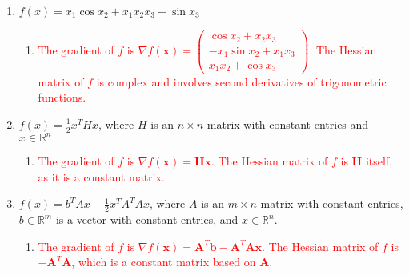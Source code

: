 \documentclass[11pt]{article}
\begin{document}
\begin{enumerate}
\begin{enumerate}
  \item $f(x) = x_1 \cos x_2 + x_1x_2x_3 + \sin x_3$

    \begin{enumerate}
        \item[\textcolor{red}{}] \textcolor{red}{
        The gradient of $f$ is $\nabla f(\mathbf{x}) = \begin{pmatrix} \cos x_2 + x_2x_3 \\ -x_1 \sin x_2 + x_1x_3 \\ x_1x_2 + \cos x_3 \end{pmatrix}$. The Hessian matrix of $f$ is complex and involves second derivatives of trigonometric functions.
        }
    \end{enumerate}
  
  \item $f(x) = \frac{1}{2} x^T\!Hx$, where $H$ is an $n \times n$
    matrix with constant entries and $x \in \mathbb{R}^n$

    \begin{enumerate}
        \item[\textcolor{red}{}] \textcolor{red}{
        The gradient of $f$ is $\nabla f(\mathbf{x}) = \mathbf{H} \mathbf{x}$. The Hessian matrix of $f$ is $\mathbf{H}$ itself, as it is a constant matrix.
        }
    \end{enumerate}
    
  \item $f(x) = b^T\!Ax - \frac{1}{2} x^TA^TAx$, where $A$ is an $m
    \times n$ matrix with constant entries, $b \in \mathbb{R}^m$ is a vector
    with constant entries, and $x \in \mathbb{R}^n$.

    \begin{enumerate}
        \item[\textcolor{red}{}] \textcolor{red}{
        The gradient of $f$ is $\nabla f(\mathbf{x}) = \mathbf{A}^T \mathbf{b} - \mathbf{A}^T \mathbf{A} \mathbf{x}$. The Hessian matrix of $f$ is $-\mathbf{A}^T \mathbf{A}$, which is a constant matrix based on $\mathbf{A}$.
        }
    \end{enumerate}
    
  \end{enumerate}
  

\end{enumerate}
\end{document}
